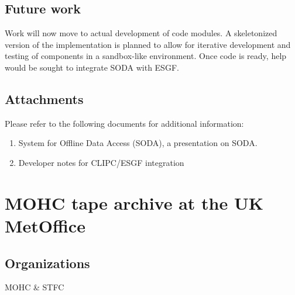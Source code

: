 \documentclass[10pt,one-side,a4paper]{memoir}
\begin{document}
\subsection{Future work}
Work will now move to actual development of code modules. A skeletonized  version of the implementation is planned to allow for iterative development and testing of components in a sandbox-like environment. Once code is ready, help would be sought to integrate SODA with ESGF.

\subsection{Attachments}
Please refer to the following documents for additional information:
\begin{enumerate}
\item System for Offline Data Access (SODA), a presentation on SODA.
\item Developer notes for CLIPC/ESGF integration
\end{enumerate}
\section{MOHC tape archive at the UK MetOffice}
\subsection{Organizations}
MOHC \& STFC
\end{document}
